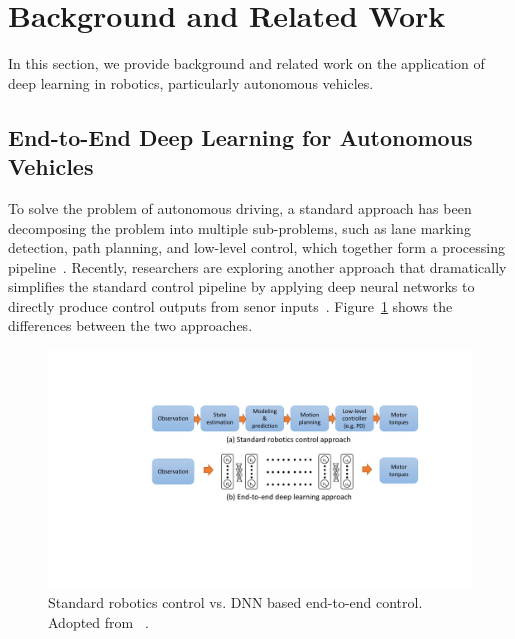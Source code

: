 \section{Background and Related Work} \label{sec:background}

In this section, we provide background and related work on the
application of deep learning in robotics, particularly autonomous
vehicles. 

\subsection{End-to-End Deep Learning for Autonomous Vehicles}


To solve the problem of autonomous driving, a standard approach has
been decomposing the problem into multiple sub-problems,
such as lane marking detection, path planning, and low-level
control, which together form a processing pipeline~\cite{Bojarski2016}.
Recently, researchers are exploring another approach that dramatically
simplifies the standard control pipeline by applying deep neural
networks to directly produce control outputs from senor
inputs~\cite{Levine2016}. Figure~\ref{fig:end-to-end-control}
shows the differences between the two approaches.

\begin{figure}[h]
  \centering
  \includegraphics[width=.75\textwidth]{figs/endtoend_redrawn}
  \caption{Standard robotics control vs. DNN based end-to-end
    control. Adopted from ~\cite{Levine2017cs294}.}
  \label{fig:end-to-end-control}
\end{figure}


